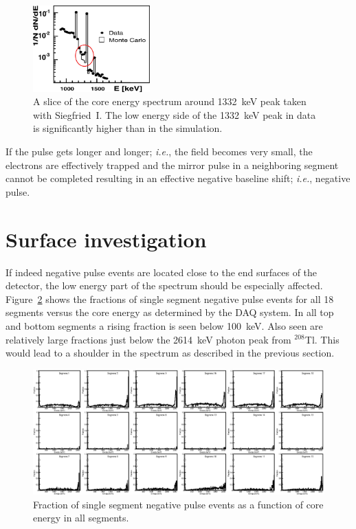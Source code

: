 \begin{figure}
\centering
\includegraphics[width=0.4\textwidth]{dmcnew}
\caption{A slice of the core energy spectrum around 1332~keV peak
taken with Siegfried~I. The low energy side of the 1332~keV peak in
data is significantly higher than in the simulation.}
\label{fig:np:shou}
\end{figure}

If the pulse gets longer and longer; \textit{i.e.}, the field becomes
very small, the electrons are effectively trapped and the mirror pulse
in a neighboring segment cannot be completed resulting in an effective
negative baseline shift; \textit{i.e.}, negative pulse.

\section{Surface investigation}
\label{sec:np:inv}
If indeed negative pulse events are located close to the end surfaces
of the detector, the low energy part of the spectrum should be
especially affected. Figure~\ref{fig:np:fracall} shows the fractions
of single segment negative pulse events for all 18 segments versus the
core energy as determined by the DAQ system. In all top and bottom
segments a rising fraction is seen below 100~keV. Also seen are
relatively large fractions just below the 2614~keV photon peak from
$^{208}$Tl. This would lead to a shoulder in the spectrum as described
in the previous section.

\begin{figure}
\centering
\includegraphics{NegFractionAll}
\caption{Fraction of single segment negative pulse events as a
function of core energy in all segments.}
\label{fig:np:fracall}
\end{figure}

